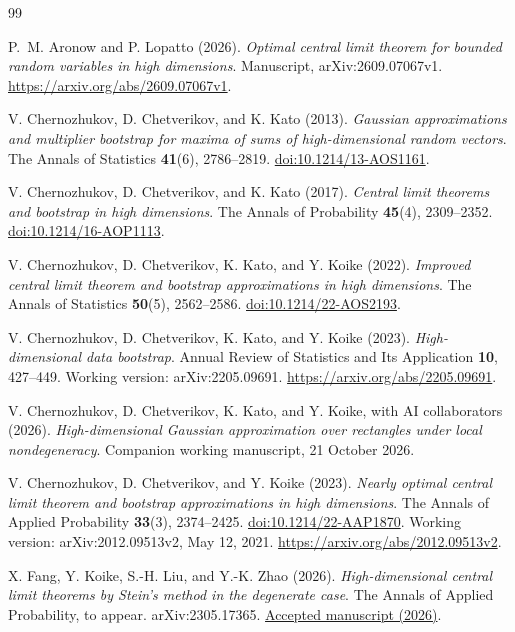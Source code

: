 \documentclass[11pt,letterpaper]{article}
\theoremstyle{remark}
\begin{document}
\begin{thebibliography}{99}
\setlength{\itemsep}{1pt}
{}
P.~M. Aronow and P. Lopatto (2026).
\emph{Optimal central limit theorem for bounded random variables in high dimensions}.
Manuscript, arXiv:2609.07067v1.
\url{https://arxiv.org/abs/2609.07067v1}.

V. Chernozhukov, D. Chetverikov, and K. Kato (2013).
\emph{Gaussian approximations and multiplier bootstrap for maxima of
sums of high-dimensional random vectors}.
The Annals of Statistics \textbf{41}(6), 2786--2819.
\href{https://doi.org/10.1214/13-AOS1161}{doi:10.1214/13-AOS1161}.

V. Chernozhukov, D. Chetverikov, and K. Kato (2017).
\emph{Central limit theorems and bootstrap in high dimensions}.
The Annals of Probability \textbf{45}(4), 2309--2352.
\href{https://doi.org/10.1214/16-AOP1113}{doi:10.1214/16-AOP1113}.

V. Chernozhukov, D. Chetverikov, K. Kato, and Y. Koike (2022).
\emph{Improved central limit theorem and bootstrap approximations in
high dimensions}. The Annals of Statistics \textbf{50}(5), 2562--2586.
\href{https://doi.org/10.1214/22-AOS2193}{doi:10.1214/22-AOS2193}.

V. Chernozhukov, D. Chetverikov, K. Kato, and Y. Koike (2023).
\emph{High-dimensional data bootstrap}.
Annual Review of Statistics and Its Application \textbf{10}, 427--449.
Working version: arXiv:2205.09691.
\url{https://arxiv.org/abs/2205.09691}.

V. Chernozhukov, D. Chetverikov, K. Kato, and Y. Koike,
with AI collaborators (2026).
\emph{High-dimensional Gaussian approximation over rectangles under
local nondegeneracy}. Companion working manuscript, 21 October 2026.

V. Chernozhukov, D. Chetverikov, and Y. Koike (2023).
\emph{Nearly optimal central limit theorem and bootstrap approximations
in high dimensions}.
The Annals of Applied Probability \textbf{33}(3), 2374--2425.
\href{https://doi.org/10.1214/22-AAP1870}{doi:10.1214/22-AAP1870}.
Working version: arXiv:2012.09513v2, May 12, 2021.
\url{https://arxiv.org/abs/2012.09513v2}.

X. Fang, Y. Koike, S.-H. Liu, and Y.-K. Zhao (2026).
\emph{High-dimensional central limit theorems by Stein's method in
the degenerate case}. The Annals of Applied Probability, to appear.
arXiv:2305.17365.
\href{https://research.cuhk.edu.hk/en/publications/high-dimensional-central-limit-theorems-by-steins-method-in-the-d/}{Accepted manuscript (2026)}.


\end{thebibliography}
\end{document}
